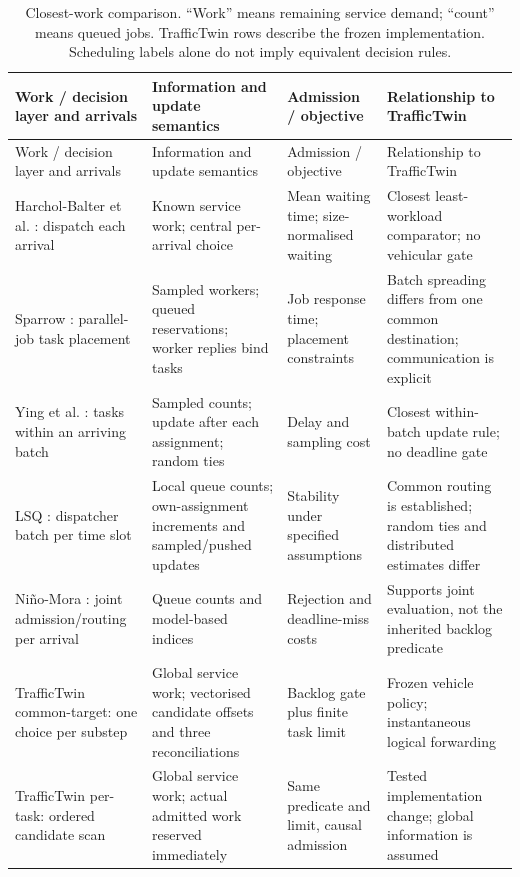 \documentclass[12pt,a4paper]{article}
\begin{document}
\begingroup
\singlespacing\footnotesize\setlength{\tabcolsep}{3pt}
\renewcommand{\thetable}{1}
\begin{xltabular}{\textwidth}{@{}YYYY@{}}
\caption[Closest-work comparison]{Closest-work comparison. ``Work'' means remaining service demand; ``count'' means queued jobs. TrafficTwin rows describe the frozen implementation. Scheduling labels alone do not imply equivalent decision rules.}\label{tab:1} \\
\toprule
Work / decision layer and arrivals & Information and update semantics & Admission / objective & Relationship to TrafficTwin \\
\midrule\endfirsthead
\toprule
Work / decision layer and arrivals & Information and update semantics & Admission / objective & Relationship to TrafficTwin \\
\midrule\endhead
\bottomrule\endfoot
Harchol-Balter et al. \cite{ref14}: dispatch each arrival & Known service work; central per-arrival choice & Mean waiting time; size-normalised waiting & Closest least-workload comparator; no vehicular gate \\
Sparrow \cite{ref15}: parallel-job task placement & Sampled workers; queued reservations; worker replies bind tasks & Job response time; placement constraints & Batch spreading differs from one common destination; communication is explicit \\
Ying et al. \cite{ref16}: tasks within an arriving batch & Sampled counts; update after each assignment; random ties & Delay and sampling cost & Closest within-batch update rule; no deadline gate \\
LSQ \cite{ref18}: dispatcher batch per time slot & Local queue counts; own-assignment increments and sampled/pushed updates & Stability under specified assumptions & Common routing is established; random ties and distributed estimates differ \\
Niño-Mora \cite{ref20}: joint admission/routing per arrival & Queue counts and model-based indices & Rejection and deadline-miss costs & Supports joint evaluation, not the inherited backlog predicate \\
TrafficTwin common-target: one choice per substep & Global service work; vectorised candidate offsets and three reconciliations & Backlog gate plus finite task limit & Frozen vehicle policy; instantaneous logical forwarding \\
TrafficTwin per-task: ordered candidate scan & Global service work; actual admitted work reserved immediately & Same predicate and limit, causal admission & Tested implementation change; global information is assumed \\
\end{xltabular}
\endgroup
\end{document}
